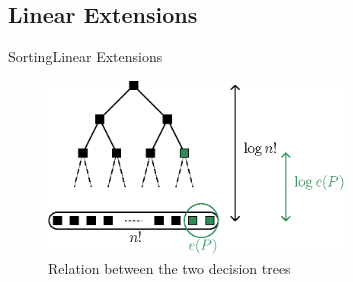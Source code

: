 \subsection{Linear Extensions}
\begin{frame}[c]{Sorting}{Linear Extensions}
\begin{figure}[hbtp]
\centering
\includegraphics[width=0.7\textwidth]{fig/itlb-supi}
\caption{Relation between the two decision trees}
\end{figure}
\end{frame}